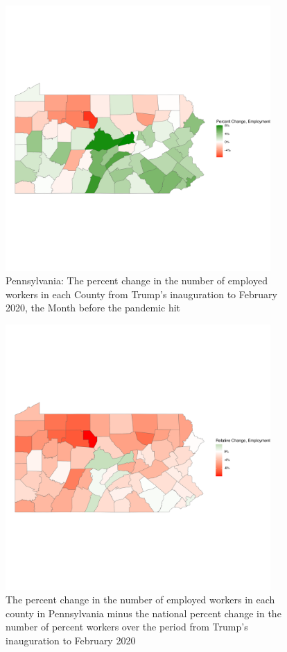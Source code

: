 \documentclass[11pt]{article}
\begin{document}
\begin{figure}
   \centering
   \includegraphics[width=0.9\textwidth]{plots/raw-employment-plot-pa.png}
   \caption{Pennsylvania: The percent change in the number of employed workers in each County from Trump's inauguration to February 2020, the Month before the pandemic hit}
\end{figure}
\begin{figure}
    \centering
    \includegraphics[width=0.9\textwidth]{plots/relative-employment-plot-pa.png}
    \caption{The percent change in the number of employed workers in each county in Pennsylvania minus the national percent change in the number of percent workers over the period from Trump's inauguration to February 2020}
\end{figure}
\end{document}
